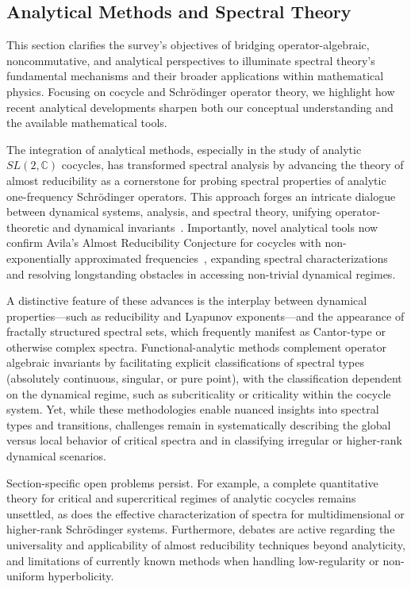 \documentclass[sigconf]{acmart}
\begin{document}
\subsection{Analytical Methods and Spectral Theory}

This section clarifies the survey’s objectives of bridging operator-algebraic, noncommutative, and analytical perspectives to illuminate spectral theory’s fundamental mechanisms and their broader applications within mathematical physics. Focusing on cocycle and Schrödinger operator theory, we highlight how recent analytical developments sharpen both our conceptual understanding and the available mathematical tools.

The integration of analytical methods, especially in the study of analytic $SL(2,\mathbb{C})$ cocycles, has transformed spectral analysis by advancing the theory of almost reducibility as a cornerstone for probing spectral properties of analytic one-frequency Schrödinger operators. This approach forges an intricate dialogue between dynamical systems, analysis, and spectral theory, unifying operator-theoretic and dynamical invariants~\cite{ref91}. Importantly, novel analytical tools now confirm Avila's Almost Reducibility Conjecture for cocycles with non-exponentially approximated frequencies~\cite{ref91}, expanding spectral characterizations and resolving longstanding obstacles in accessing non-trivial dynamical regimes.

A distinctive feature of these advances is the interplay between dynamical properties—such as reducibility and Lyapunov exponents—and the appearance of fractally structured spectral sets, which frequently manifest as Cantor-type or otherwise complex spectra. Functional-analytic methods complement operator algebraic invariants by facilitating explicit classifications of spectral types (absolutely continuous, singular, or pure point), with the classification dependent on the dynamical regime, such as subcriticality or criticality within the cocycle system. Yet, while these methodologies enable nuanced insights into spectral types and transitions, challenges remain in systematically describing the global versus local behavior of critical spectra and in classifying irregular or higher-rank dynamical scenarios.

Section-specific open problems persist. For example, a complete quantitative theory for critical and supercritical regimes of analytic cocycles remains unsettled, as does the effective characterization of spectra for multidimensional or higher-rank Schrödinger systems. Furthermore, debates are active regarding the universality and applicability of almost reducibility techniques beyond analyticity, and limitations of currently known methods when handling low-regularity or non-uniform hyperbolicity.
\end{document}
